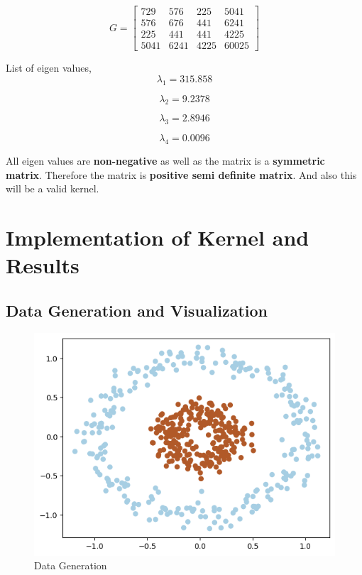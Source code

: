 \documentclass[11pt,a4paper]{article}
\begin{document}
\newpage

\begin{equation}
    G = 
    \begin{bmatrix}
        729 & 576 & 225 & 5041 \\
        576 & 676 & 441 & 6241 \\
        225 & 441 & 441 & 4225 \\
        5041 & 6241 & 4225 & 60025
    \end{bmatrix}
\end{equation}

List of eigen values,
\begin{equation}
    \lambda_1 = 315.858
\end{equation}

\begin{equation}
    \lambda_2 = 9.2378
\end{equation}

\begin{equation}
    \lambda_3 = 2.8946
\end{equation}

\begin{equation}
    \lambda_4 = 0.0096
\end{equation}

All eigen values are \textbf{non-negative} as well as the matrix is a \textbf{symmetric matrix}. Therefore the matrix is \textbf{positive semi definite matrix}. And also this will be a valid kernel.

\section{Implementation of Kernel and Results}

\subsection{Data Generation and Visualization}

\lstset{style=mystyle}


{\begin{figure}[h]
    \centering
    \includegraphics[width=1.0\linewidth]{images/1.png}
    \caption{Data Generation}
\end{figure}}
\end{document}
